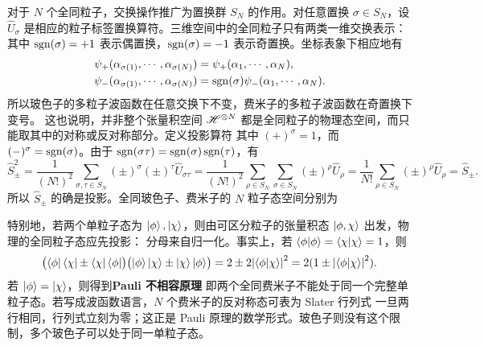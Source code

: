 对于 $N$ 个全同粒子，交换操作推广为置换群 $S_N$ 的作用。对任意置换 $\sigma\in S_N$，设 $\hat U_\sigma$ 是相应的粒子标签置换算符。三维空间中的全同粒子只有两类一维交换表示：
其中 $\operatorname{sgn}(\sigma)=+1$ 表示偶置换，$\operatorname{sgn}(\sigma)=-1$ 表示奇置换。坐标表象下相应地有
\begin{align}
    \psi_+(\alpha_{\sigma(1)},\cdots,\alpha_{\sigma(N)})
    &=
    \psi_+(\alpha_1,\cdots,\alpha_N),\\
    \psi_-(\alpha_{\sigma(1)},\cdots,\alpha_{\sigma(N)})
    &=
    \operatorname{sgn}(\sigma)\psi_-(\alpha_1,\cdots,\alpha_N).
\end{align}
所以玻色子的多粒子波函数在任意交换下不变，费米子的多粒子波函数在奇置换下变号。
这也说明，并非整个张量积空间 $\mathscr{H}^{\otimes N}$ 都是全同粒子的物理态空间，而只能取其中的对称或反对称部分。定义投影算符
其中 $(+)^\sigma=1$，而 $(-)^\sigma=\operatorname{sgn}(\sigma)$。由于 $\operatorname{sgn}(\sigma\tau)=\operatorname{sgn}(\sigma)\operatorname{sgn}(\tau)$，有
\[
    \hat S_\pm^2
    =
    \frac{1}{(N!)^2}\sum_{\sigma,\tau\in S_N}
    (\pm)^\sigma(\pm)^\tau \hat U_{\sigma\tau} =
    \frac{1}{(N!)^2}\sum_{\rho\in S_N}
    \sum_{\sigma\in S_N}(\pm)^\rho \hat U_\rho
    =
    \frac{1}{N!}\sum_{\rho\in S_N}(\pm)^\rho \hat U_\rho
    =
    \hat S_\pm.
\]
所以 $\hat S_\pm$ 的确是投影。全同玻色子、费米子的 $N$ 粒子态空间分别为

特别地，若两个单粒子态为 $\ket{\phi},\ket{\chi}$，则由可区分粒子的张量积态 $\ket{\phi,\chi}$ 出发，物理的全同粒子态应先投影：
分母来自归一化。事实上，若 $\ip{\phi}=\ip{\chi}=1$，则
\begin{align*}
    \bigl(\bra{\phi}\bra{\chi}\pm\bra{\chi}\bra{\phi}\bigr)
    \bigl(\ket{\phi}\ket{\chi}\pm\ket{\chi}\ket{\phi}\bigr) =
    2\pm 2\abs{\ip{\phi}{\chi}}^2
    =
    2(1\pm\abs{\ip{\phi}{\chi}}^2).
\end{align*}
若 $\ket{\phi}=\ket{\chi}$，则得到\textbf{Pauli 不相容原理}
即两个全同费米子不能处于同一个完整单粒子态。若写成波函数语言，$N$ 个费米子的反对称态可表为 Slater 行列式
一旦两行相同，行列式立刻为零；这正是 Pauli 原理的数学形式。玻色子则没有这个限制，多个玻色子可以处于同一单粒子态。

